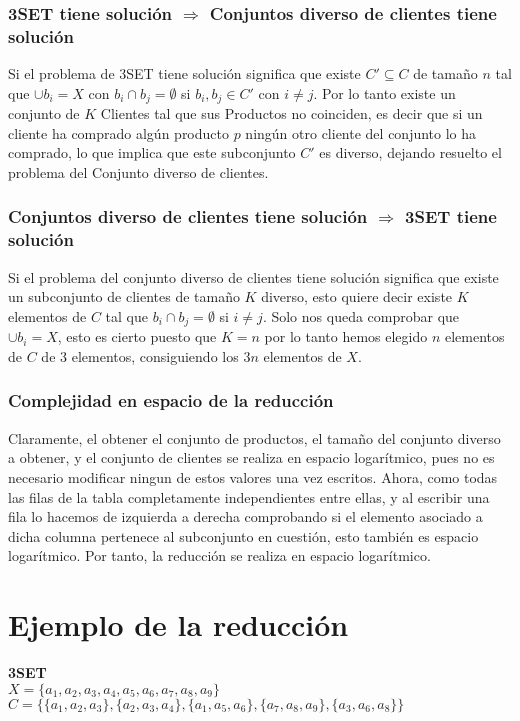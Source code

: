 \documentclass[11pt]{article}
\begin{document}
\subsubsection*{3SET tiene solución $\Rightarrow$ Conjuntos diverso de clientes tiene solución}
Si el problema de 3SET tiene solución significa que existe $C' \subseteq C$ de tamaño $n$ tal que $\cup b_i = X$ con $b_i \cap b_j = \emptyset $ si $b_i, b_j \in C'$ con $i\neq j$. Por lo tanto existe un conjunto de $K$ Clientes tal que sus Productos no coinciden, es decir que si un cliente ha comprado algún producto $p$ ningún otro cliente del conjunto lo ha comprado, lo que implica que este subconjunto $C'$ es diverso, dejando resuelto el problema del Conjunto diverso de clientes.
\\
\subsubsection*{Conjuntos diverso de clientes tiene solución $\Rightarrow$ 3SET tiene solución}
Si el problema del conjunto diverso de clientes tiene solución significa que existe un subconjunto de clientes de tamaño $K$ diverso, esto quiere decir existe $K$ elementos de $C$  tal que $b_i \cap b_j = \emptyset$ si $i \neq j$. Solo nos queda comprobar que $\cup b_i = X$, esto es cierto puesto que $K = n$ por lo tanto hemos elegido $n$ elementos de $C$ de 3 elementos, consiguiendo los $3n$ elementos de $X$.\\

\subsubsection*{Complejidad en espacio de la reducción}
Claramente, el obtener el conjunto de productos, el tamaño del conjunto diverso a obtener, y el conjunto de clientes se realiza en espacio logarítmico, pues no es necesario modificar ningun de estos valores una vez escritos. Ahora, como todas las filas de la tabla completamente independientes entre ellas, y al escribir una fila lo hacemos de izquierda a derecha comprobando si el elemento asociado a dicha columna pertenece al subconjunto en cuestión, esto también es espacio logarítmico.
Por tanto, la reducción se realiza en espacio logarítmico.
\section*{Ejemplo de la reducción}
\textbf{3SET} \\
$X = \{a_1, a_2, a_3, a_4, a_5, a_6, a_7, a_8, a_9\}$ \\
$C = \Big\{ \{a_1, a_2, a_3 \}, \{a_2, a_3, a_4 \}, \{ a_1, a_5, a_6 \}, \{a_7,a_8,a_9\}, \{a_3,a_6,a_8\} \Big\}$
\end{document}

